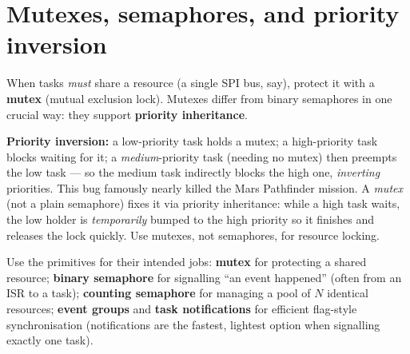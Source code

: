 \documentclass[11pt,a4paper,oneside]{book}
\begin{document}
\section{Mutexes, semaphores, and priority inversion}
When tasks \emph{must} share a resource (a single SPI bus, say), protect it with
a \textbf{mutex} (mutual exclusion lock). Mutexes differ from binary semaphores
in one crucial way: they support \textbf{priority inheritance}.

\begin{warning}
\textbf{Priority inversion:} a low-priority task holds a mutex; a high-priority
task blocks waiting for it; a \emph{medium}-priority task (needing no mutex) then
preempts the low task --- so the medium task indirectly blocks the high one,
\emph{inverting} priorities. This bug famously nearly killed the Mars Pathfinder
mission. A \emph{mutex} (not a plain semaphore) fixes it via priority
inheritance: while a high task waits, the low holder is \emph{temporarily} bumped
to the high priority so it finishes and releases the lock quickly. Use mutexes,
not semaphores, for resource locking.
\end{warning}

Use the primitives for their intended jobs: \textbf{mutex} for protecting a
shared resource; \textbf{binary semaphore} for signalling ``an event happened''
(often from an ISR to a task); \textbf{counting semaphore} for managing a pool
of $N$ identical resources; \textbf{event groups} and \textbf{task
notifications} for efficient flag-style synchronisation (notifications are the
fastest, lightest option when signalling exactly one task).
\end{document}
